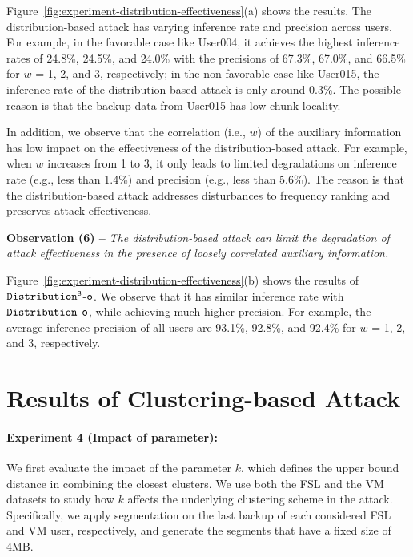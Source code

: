 \documentclass[bachelor]{thesis-uestc}
\begin{document}
Figure~\ref{fig:experiment-distribution-effectiveness}(a) shows the results. The
distribution-based attack has varying inference rate and precision  across
users. For example, in the favorable case like User004, it achieves the
highest inference rates of 24.8\%, 24.5\%, and 24.0\% with the precisions of
67.3\%, 67.0\%, and 66.5\% for $w$ = 1, 2, and 3, respectively; in the
non-favorable case like User015, the inference rate of the distribution-based
attack is only around 0.3\%. The possible reason is that the backup data from
User015 has low chunk locality. 

In addition, we observe that the correlation (i.e., $w$) of the auxiliary
information has low impact on the effectiveness of the distribution-based
attack.  For example, when $w$ increases from 1 to 3, it only leads to limited
degradations on inference rate (e.g., less than 1.4\%) and precision (e.g.,
less than 5.6\%). The reason is that the distribution-based attack addresses
disturbances to frequency ranking and preserves attack effectiveness.  

{\bf Observation (6) --} {\em The distribution-based attack can limit the
degradation of attack effectiveness in the presence of loosely correlated
auxiliary information.} 

 Figure~\ref{fig:experiment-distribution-effectiveness}(b) shows the results of $\tt Distribution^S$-$\tt o$. We observe that it has similar inference rate with $\tt Distribution$-$\tt o$,  
 while achieving much higher precision. For example, the average inference precision of all users are 93.1\%, 92.8\%, and 92.4\% for $w$ = 1, 2, and 3, respectively.  



\section{Results of Clustering-based Attack}
\label{sec:experiment-clustering}




\paragraph{Experiment 4 (Impact of parameter):} We first evaluate the impact
of the parameter $k$, which defines the upper bound distance
in combining the closest clusters.  We use both the FSL and the VM datasets to
study how $k$ affects the underlying clustering scheme in the attack.
Specifically, we apply segmentation on the last backup of each considered FSL
and VM user, respectively, and generate the segments that have a fixed size of
4MB. 
\end{document}
